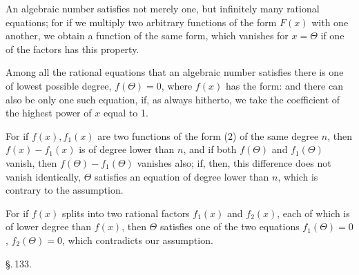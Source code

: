 
An algebraic number satisfies not merely one, but infinitely many rational equations; for if we multiply two arbitrary functions of the form $F(x)$ with one another, we obtain a function of the same form, which vanishes for $x = \Theta$ if one of the factors has this property.

Among all the rational equations that an algebraic number satisfies there is one of lowest possible degree, $f(\Theta) = 0$, where $f(x)$ has the form:
and there can also be only one such equation, if, as always hitherto, we take the coefficient of the highest power of $x$ equal to 1.

For if $f(x), f_1(x)$ are two functions of the form (2) of the same degree $n$, then $f(x) - f_1(x)$ is of degree lower than $n$, and if both $f(\Theta)$ and $f_1(\Theta)$ vanish, then $f(\Theta) - f_1(\Theta)$ vanishes also; if, then, this difference does not vanish identically, $\Theta$ satisfies an equation of degree lower than $n$, which is contrary to the assumption.


For if $f(x)$ splits into two rational factors $f_1(x)$ and $f_2(x)$, each of which is of lower degree than $f(x)$, then $\Theta$ satisfies one of the two equations $f_1(\Theta) = 0$, $f_2(\Theta) = 0$, which contradicts our assumption.


\begin{center}
\S.\,133.

\end{center}

